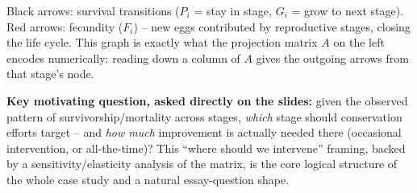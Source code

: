 \documentclass[11pt,a4paper]{article}
\begin{document}
\begin{figbox}[title={Life-cycle graph for the five-stage loggerhead turtle model}]
\centering
{}

\vspace{2mm}
\footnotesize Black arrows: survival transitions ($P_i$ = stay in stage, $G_i$ = grow to next stage). Red arrows: fecundity ($F_i$) -- new eggs contributed by reproductive stages, closing the life cycle. This graph is exactly what the projection matrix $A$ on the left encodes numerically: reading down a column of $A$ gives the outgoing arrows from that stage's node.
\end{figbox}

\begin{exambox}
\textbf{Key motivating question, asked directly on the slides:} given the observed pattern of survivorship/mortality across stages, \emph{which} stage should conservation efforts target -- and \emph{how much} improvement is actually needed there (occasional intervention, or all-the-time)? This ``where should we intervene'' framing, backed by a sensitivity/elasticity analysis of the matrix, is the core logical structure of the whole case study and a natural essay-question shape.
\end{exambox}
\end{document}
